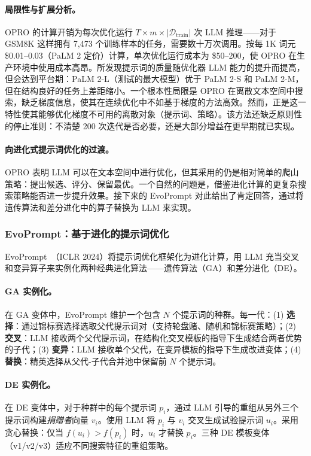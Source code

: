 \paragraph{局限性与扩展分析。}
OPRO 的计算开销为每次优化运行 $T \times m \times |\mathcal{D}_{\text{train}}|$ 次 LLM 推理——对于 GSM8K 这样拥有 7,473 个训练样本的任务，需要数十万次调用。按每 1K 词元 \$0.01--0.03（PaLM 2 定价）计算，单次优化运行成本为 \$50--200，使 OPRO 在生产环境中使用成本高昂。所发现提示词的质量随优化器 LLM 能力的提升而提高，但会达到平台期：PaLM 2-L（测试的最大模型）优于 PaLM 2-S 和 PaLM 2-M，但在结构良好的任务上差距缩小。一个根本性局限是 OPRO 在离散文本空间中搜索，缺乏梯度信息，使其在连续优化中不如基于梯度的方法高效。然而，正是这一特性使其能够优化梯度不可用的离散对象（提示词、策略）。该方法还缺乏原则性的停止准则：不清楚 200 次迭代是否必要，还是大部分增益在更早期就已实现。

\paragraph{向进化式提示词优化的过渡。}
OPRO 表明 LLM 可以在文本空间中进行优化，但其采用的仍是相对简单的爬山策略：提出候选、评分、保留最优。一个自然的问题是，借鉴进化计算的更复杂搜索策略能否进一步提升效果。接下来的 EvoPrompt 对此给出了肯定回答，通过将遗传算法和差分进化中的算子替换为 LLM 来实现。


\subsubsection{EvoPrompt：基于进化的提示词优化}

EvoPrompt~\citep{evoprompt2024}（ICLR 2024）将提示词优化框架化为进化计算，用 LLM 充当交叉和变异算子来实例化两种经典进化算法——遗传算法（GA）和差分进化（DE）。

\paragraph{GA 实例化。}
在 GA 变体中，EvoPrompt 维护一个包含 $N$ 个提示词的种群。每一代：(1) \textbf{选择}：通过锦标赛选择选取父代提示词对（支持轮盘赌、随机和锦标赛策略）；(2) \textbf{交叉}：LLM 接收两个父代提示词，在结构化交叉模板的指导下生成结合两者优势的子代；(3) \textbf{变异}：LLM 接收单个父代，在变异模板的指导下生成改进变体；(4) \textbf{替换}：精英选择从父代-子代合并池中保留前 $N$ 个提示词。

\paragraph{DE 实例化。}
在 DE 变体中，对于种群中的每个提示词 $p_i$，通过 LLM 引导的重组从另外三个提示词构建\emph{捐赠者}向量 $v_i$。使用 LLM 将 $p_i$ 与 $v_i$ 交叉生成试验提示词 $u_i$。采用贪心替换：仅当 $f(u_i) > f(p_i)$ 时，$u_i$ 才替换 $p_i$。三种 DE 模板变体（v1/v2/v3）适应不同搜索特征的重组策略。

